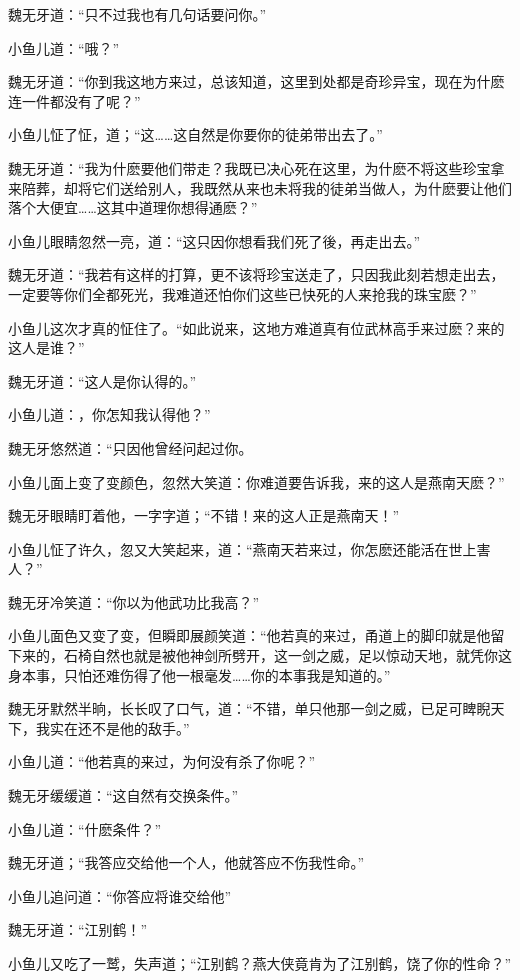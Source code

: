 \documentclass[12pt,oneside]{book}
\begin{document}
魏无牙道：``只不过我也有几句话要问你。''

小鱼儿道：``哦？''

魏无牙道：``你到我这地方来过，总该知道，这里到处都是奇珍异宝，现在为什麽连一件都没有了呢？''

小鱼儿怔了怔，道；``这\ldots\ldots 这自然是你要你的徒弟带出去了。''

魏无牙道：``我为什麽要他们带走？我既已决心死在这里，为什麽不将这些珍宝拿来陪葬，却将它们送给别人，我既然从来也未将我的徒弟当做人，为什麽要让他们落个大便宜\ldots\ldots 这其中道理你想得通麽？''

小鱼儿眼睛忽然一亮，道：``这只因你想看我们死了後，再走出去。''

魏无牙道：``我若有这样的打算，更不该将珍宝送走了，只因我此刻若想走出去，一定要等你们全都死光，我难道还怕你们这些已快死的人来抢我的珠宝麽？''

小鱼儿这次才真的怔住了。``如此说来，这地方难道真有位武林高手来过麽？来的这人是谁？''

魏无牙道：``这人是你认得的。''

小鱼儿道：，你怎知我认得他？''

魏无牙悠然道：``只因他曾经问起过你。

小鱼儿面上变了变颜色，忽然大笑道：你难道要告诉我，来的这人是燕南天麽？''

魏无牙眼睛盯着他，一字字道；``不错！来的这人正是燕南天！''

小鱼儿怔了许久，忽又大笑起来，道：``燕南天若来过，你怎麽还能活在世上害人？''

魏无牙冷笑道：``你以为他武功比我高？''

小鱼儿面色又变了变，但瞬即展颜笑道：``他若真的来过，甬道上的脚印就是他留下来的，石椅自然也就是被他神剑所劈开，这一剑之威，足以惊动天地，就凭你这身本事，只怕还难伤得了他一根毫发\ldots\ldots 你的本事我是知道的。''

魏无牙默然半晌，长长叹了口气，道：``不错，单只他那一剑之威，已足可睥睨天下，我实在还不是他的敌手。''

小鱼儿道：``他若真的来过，为何没有杀了你呢？''

魏无牙缓缓道：``这自然有交换条件。''

小鱼儿道：``什麽条件？''

魏无牙道；``我答应交给他一个人，他就答应不伤我性命。''

小鱼儿追问道：``你答应将谁交给他''

魏无牙道：``江别鹤！''

小鱼儿又吃了一鹫，失声道；``江别鹤？燕大侠竟肯为了江别鹤，饶了你的性命？''
\end{document}
